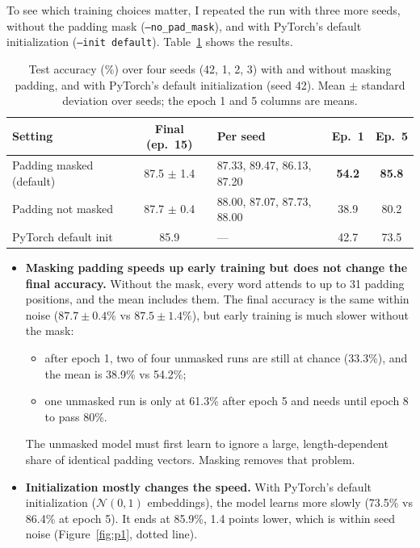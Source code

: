 \documentclass[11pt]{article}
\newcommand{\code}[1]{\texttt{#1}}
\begin{document}
To see which training choices matter, I repeated the run with three more seeds, without the padding mask (\code{--no\_pad\_mask}), and with PyTorch's default initialization (\code{--init default}). Table~\ref{tab:seeds1} shows the results.

\begin{table}[H]
\centering
\footnotesize
\setlength{\tabcolsep}{5pt}
\caption{Test accuracy (\%) over four seeds (42, 1, 2, 3) with and without masking padding, and with PyTorch's default initialization (seed 42). Mean $\pm$ standard deviation over seeds; the epoch 1 and 5 columns are means.}
\label{tab:seeds1}
\begin{tabular}{@{}l c l c c@{}}
\toprule
Setting & Final (ep.\ 15) & Per seed & Ep.\ 1 & Ep.\ 5 \\
\midrule
Padding masked (default) & 87.5 $\pm$ 1.4 & 87.33, 89.47, 86.13, 87.20 & \textbf{54.2} & \textbf{85.8} \\
Padding not masked & 87.7 $\pm$ 0.4 & 88.00, 87.07, 87.73, 88.00 & 38.9 & 80.2 \\
PyTorch default init & 85.9 & --- & 42.7 & 73.5 \\
\bottomrule
\end{tabular}
\end{table}

\begin{itemize}
  \item \textbf{Masking padding speeds up early training but does not change the final accuracy.} Without the mask, every word attends to up to 31 padding positions, and the mean includes them. The final accuracy is the same within noise ($87.7 \pm 0.4\%$ vs $87.5 \pm 1.4\%$), but early training is much slower without the mask:
  \begin{itemize}
    \item after epoch 1, two of four unmasked runs are still at chance (33.3\%), and the mean is 38.9\% vs 54.2\%;
    \item one unmasked run is only at 61.3\% after epoch 5 and needs until epoch 8 to pass 80\%.
  \end{itemize}
  The unmasked model must first learn to ignore a large, length-dependent share of identical padding vectors. Masking removes that problem.
  \item \textbf{Initialization mostly changes the speed.} With PyTorch's default initialization ($\mathcal{N}(0,1)$ embeddings), the model learns more slowly (73.5\% vs 86.4\% at epoch 5). It ends at 85.9\%, 1.4 points lower, which is within seed noise (Figure~\ref{fig:p1}, dotted line).
\end{itemize}
\end{document}
